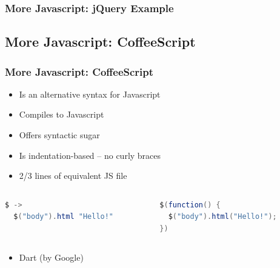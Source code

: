 \documentclass{beamer}
\begin{document}
\begin{frame}[fragile]\frametitle{More Javascript: jQuery Example} 

  

\end{frame}



\subsection{More Javascript: CoffeeScript} 
\begin{frame}[fragile]\frametitle{More Javascript: CoffeeScript} 

  \begin{itemize}
    \item Is an alternative syntax for Javascript
    \item Compiles to Javascript
    \item Offers syntactic sugar
    \item Is indentation-based -- no curly braces
    \item 2/3 lines of equivalent JS file
  \end{itemize}

  \begin{columns}[c]
  
    \begin{column}{5.5cm}
      \begin{lstlisting}[language=java, escapechar={^}]
$ -> 
  $("body").html "Hello!"
      \end{lstlisting}
    \end{column}

    \begin{column}{5.5cm}
      \begin{lstlisting}[language=java, escapechar={^}]
$(function() {
  $("body").html("Hello!");
})
      \end{lstlisting}
    \end{column}

  \end{columns}

  \begin{itemize}
    \item Dart (by Google)
  \end{itemize}

\end{frame}
\end{document}

